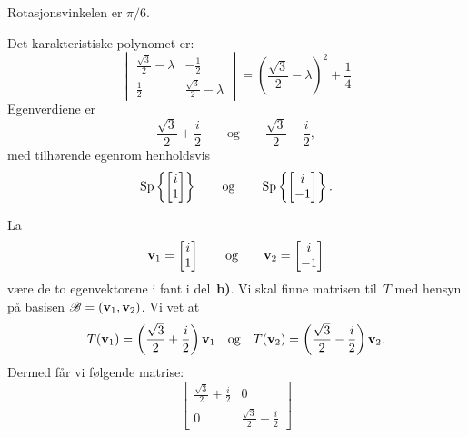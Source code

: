 \begin{losning}
\begin{punkt}
Rotasjonsvinkelen er $\pi/6$.
\end{punkt}
\begin{punkt}
Det karakteristiske polynomet er:
\[
\begin{vmatrix}
\frac{\sqrt{3}}{2} - \lambda & -\frac{1}{2}                 \\
\frac{1}{2}                  & \frac{\sqrt{3}}{2} - \lambda
\end{vmatrix}
=
\left( \frac{\sqrt{3}}{2} - \lambda \right)^2 + \frac{1}{4}
\]
Egenverdiene er
\[
\frac{\sqrt{3}}{2} + \frac{i}{2}
\qquad\text{og}\qquad
\frac{\sqrt{3}}{2} - \frac{i}{2},
\]
med tilhørende egenrom henholdsvis
\[
\operatorname{Sp} \left\{ \begin{bmatrix} i \\ 1 \end{bmatrix} \right\}
\qquad\text{og}\qquad
\operatorname{Sp} \left\{ \begin{bmatrix} i \\ -1 \end{bmatrix} \right\}.
\]
\end{punkt}
\begin{punkt}
La
\[
\mathbf{v}_1 = \begin{bmatrix} i \\ 1 \end{bmatrix}
\qquad\text{og}\qquad
\mathbf{v}_2 = \begin{bmatrix} i \\ -1 \end{bmatrix}
\]
være de to egenvektorene i fant i del~\textbf{b)}.  Vi skal finne
matrisen til~$T$ med hensyn på basisen $\mathscr{B} = (\mathbf{v}_1, \mathbf{v}_2)$.  Vi vet at
\[
T(\mathbf{v}_1) = \left( \frac{\sqrt{3}}{2} + \frac{i}{2} \right) \mathbf{v}_1
\quad\text{og}\quad
T(\mathbf{v}_2) = \left( \frac{\sqrt{3}}{2} - \frac{i}{2} \right) \mathbf{v}_2.
\]
Dermed får vi følgende matrise:
\[
\begin{bmatrix}
\frac{\sqrt{3}}{2} + \frac{i}{2} & 0 \\
0 & \frac{\sqrt{3}}{2} - \frac{i}{2}
\end{bmatrix}
\]
\end{punkt}
\end{losning}






